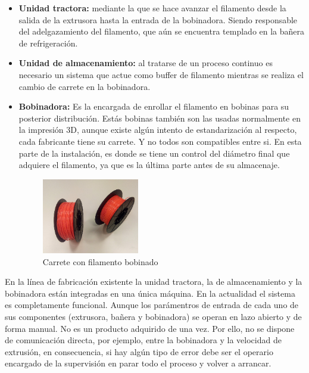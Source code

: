 \begin{itemize}
\begin{figure}[H]
        	\label{fig:intro_bañera}
    	\end{figure}
    \item \textbf{Unidad tractora:} mediante la que se hace avanzar el filamento desde la salida de la extrusora hasta la entrada de la bobinadora. Siendo responsable del adelgazamiento del filamento, que aún se encuentra templado en la bañera de refrigeración.
    \item \textbf{Unidad de almacenamiento:} al tratarse de un proceso continuo es necesario un sistema que actue como buffer de filamento mientras se realiza el cambio de carrete en la bobinadora.
    \item \textbf{Bobinadora:} Es la encargada de enrollar el filamento en bobinas para su posterior distribución. Estás bobinas también son las usadas normalmente en la impresión 3D, aunque existe algún intento de estandarización al respecto, cada fabricante tiene su carrete. Y no todos son compatibles entre si. En esta parte de la instalación, es donde se tiene un control del diámetro final que adquiere el filamento, ya que es la última parte antes de su almacenaje.
        \begin{figure}[H]
        	\centering
        	\includegraphics[width=0.4\textwidth]{images/carretes.png}
        	\caption{Carrete con filamento bobinado}
        	\label{fig:intro_carrete}
    	\end{figure}
\end{itemize}

En la línea de fabricación existente la unidad tractora, la de almacenamiento y la bobinadora están integradas en una única máquina. En la actualidad el sistema es completamente funcional. Aunque los parámentros de entrada de cada uno de sus componentes (extrusora, bañera y bobinadora) se operan en lazo abierto y de forma manual. No es un producto adquirido de una vez. Por ello, no se dispone de comunicación directa, por ejemplo, entre la bobinadora y la velocidad de extrusión, en consecuencia, si hay algún tipo de error debe ser el operario encargado de la supervisión en parar todo el proceso y volver a arrancar.\\

